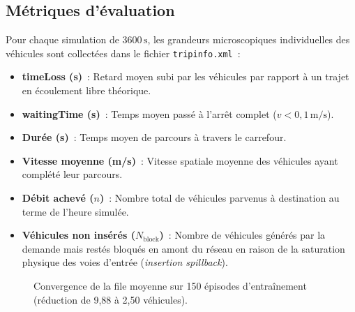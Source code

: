 \documentclass[10pt,twocolumn,letterpaper]{article}
\begin{document}
\subsection{Métriques d'évaluation}
Pour chaque simulation de $3600\,\mathrm{s}$, les grandeurs microscopiques individuelles des véhicules sont collectées dans le fichier \texttt{tripinfo.xml}~:
\begin{itemize}[nosep]
    \item \textbf{timeLoss (s)}~: Retard moyen subi par les véhicules par rapport à un trajet en écoulement libre théorique.
    \item \textbf{waitingTime (s)}~: Temps moyen passé à l'arrêt complet ($v < 0{,}1\,\mathrm{m/s}$).
    \item \textbf{Durée (s)}~: Temps moyen de parcours à travers le carrefour.
    \item \textbf{Vitesse moyenne (m/s)}~: Vitesse spatiale moyenne des véhicules ayant complété leur parcours.
    \item \textbf{Débit achevé ($n$)}~: Nombre total de véhicules parvenus à destination au terme de l'heure simulée.
    \item \textbf{Véhicules non insérés ($N_{\text{block}}$)}~: Nombre de véhicules générés par la demande mais restés bloqués en amont du réseau en raison de la saturation physique des voies d'entrée (\emph{insertion spillback}).
\end{itemize}

\begin{figure}[t]
\centering
{}
\caption{Convergence de la file moyenne sur 150 épisodes d'entraînement (réduction de 9,88 à 2,50 véhicules).}
\label{fig:training_curve}
\end{figure}
\end{document}
